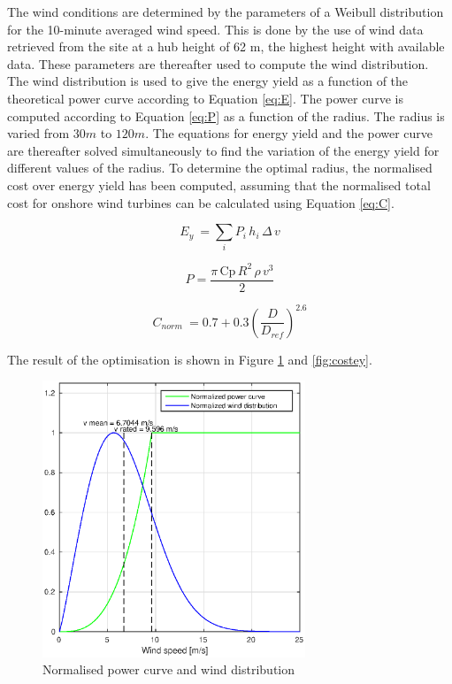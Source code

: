The wind conditions are determined by the parameters of a Weibull distribution for the 10-minute averaged wind speed. This is done by the use of wind data retrieved from the site at a hub height of 62 m, the highest height with available data. These parameters are thereafter used to compute the wind distribution. The wind distribution is used to give the energy yield as a function of the theoretical power curve according to Equation \ref{eq:E}. The power curve is computed according to Equation \ref{eq:P} as a function of the radius. The radius is varied from $30 m$ to $120 m$. The equations for energy yield and the power curve are thereafter solved simultaneously to find the variation of the energy yield for different values of the radius. To determine the optimal radius, the normalised cost over energy yield has been computed, assuming that the normalised total cost for onshore wind turbines can be calculated using Equation \ref{eq:C}.


\begin{equation}
E_{y}\ = \sum_{i} P_{i}\, h_{i}\, \Delta \, v
\label{eq:E}
\end{equation}

\begin{equation}
P = \frac{\pi\, \mathrm{Cp}\, R^2\, \rho\, v^3}{2}
\label{eq:P}
\end{equation}

\begin{equation}
C_{norm}\ = 0.7 + 0.3 {\left(\frac{D}{D_{ref}}\right)}^{2.6}
\label{eq:C}
\end{equation}


\vspace{3mm}

The result of the optimisation is shown in Figure \ref{fig:pcurve} and \ref{fig:costey}.

\begin{figure}[H]
\centering
\includegraphics[width=0.7\textwidth]{Images/power_curve.eps} 
\caption{Normalised power curve and wind distribution}\label{fig:pcurve}
\end{figure}

